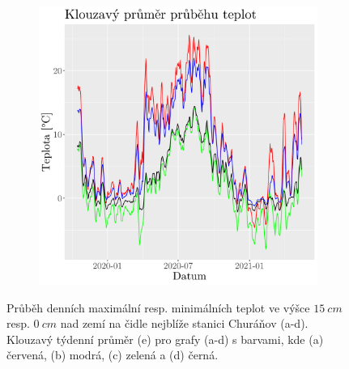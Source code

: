 \begin{figure}
\begin{subfigure}{0.45\textwidth}
  \includegraphics[width=\textwidth]{img/ch2/rollmean.png}
		\caption{}
		\label{fig:rollmean}
	\end{subfigure}
	\caption{Průběh denních maximální resp. minimálních teplot ve výšce $\SI{15}{cm}$ resp. $\SI{0}{cm}$ nad zemí na čidle nejblíže stanici Churáňov (a-d). Klouzavý týdenní průměr (e) pro grafy (a-d) s barvami, kde (a) červená, (b) modrá, (c) zelená a (d) černá.}
	\label{fig:maxtemp}
\end{figure}

